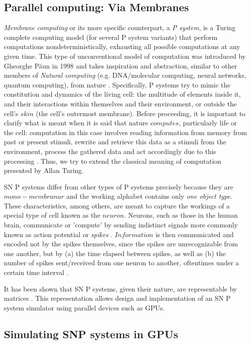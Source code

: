 \documentclass{svmultm}
\begin{document}
\subsection{Parallel computing: Via Membranes}
\textit{Membrane computing} or its more specific counterpart, a \textit{P system}, is a Turing complete computing model (for several P system variants) that perform computations nondeterministically, exhausting all possible  computations at any given time. This type of unconventional model of computation was introduced by Gheorghe P\u aun in 1998 and takes inspiration and abstraction, similar to other members of {\it Natural computing} (e.g. DNA/molecular computing, neural networks, quantum computing), from nature \cite{introtomem,ppage}. Specifically, P systems try to mimic the constitution and dynamics of the living cell: the multitude of elements inside it, and their interactions within themselves and their environment, or outside the cell's $skin$ (the cell's outermost membrane). Before proceeding, it is important to clarify what is meant when it is said that nature $computes$, particularly life or the cell: computation in this case involves reading information from memory from past or present stimuli, rewrite and retrieve this data as a stimuli from the environment, process the gathered data and act accordingly due to this processing \cite{molecular}. Thus, we try to extend the classical meaning of computation presented by Allan Turing.


SN P systems differ from other types of P systems precisely because they are $mono-membranar$ and the working alphabet contains only \textit{one object type}. These characteristics, among others, are meant to capture the workings of a special type of cell known as the $neuron$. Neurons, such as those in the human brain, communicate or 'compute' by sending indistinct signals more commonly known as action potential or \textit{spikes} \cite{snp}. $Information$ is then communicated and encoded not by the spikes themselves, since the spikes are unrecognizable from one another, but by (a) the time elapsed between spikes, as well as (b) the number of spikes sent/received from one neuron to another, oftentimes under a certain time interval \cite{snp}.

It has been shown that SN P systems, given their nature, are representable by matrices \cite{snpbrain}\cite{snpmat}. This representation allows design and implementation of an SN P system simulator using parallel devices such as GPUs. 


\subsection{Simulating SNP systems in  {GPUs}}
\end{document}
